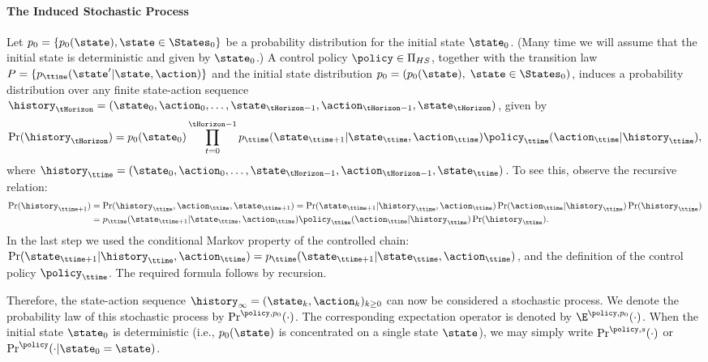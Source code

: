 \paragraph{The Induced Stochastic Process}
Let  ${p_0} = \{ {p_0}(\state),\state \in {\States_0}\} $ be a
probability distribution for the initial state ${\state_0}$. (Many
time we will assume that the initial state is deterministic and
given by $\state_0$.) A control policy $\policy \in {\Pi _{HS}}$,
together with the transition law $P = \{
{p_\ttime}(\state'|\state,\action)\} $ and the initial state
distribution ${p_0} = ({p_0}(\state),\;\state \in {\States_0})$,
induces a probability distribution over any finite state-action
sequence ${\history_\tHorizon} = ({\state_0},{\action_0}, \ldots
,{\state_{\tHorizon - 1}},{\action_{\tHorizon -
1}},{\state_\tHorizon})$, given by
\[\Pr({\history_\tHorizon}) = {p_0}({\state_0})\prod\limits_{t = 0}^{\tHorizon -1} {p_\ttime({\state_{\ttime + 1}}|{\state_\ttime},{\action_\ttime}){\policy _\ttime}({\action_\ttime}|{\history_\ttime})} ,\]
where ${\history_\ttime} = ({\state_0},{\action_0}, \ldots
,{\state_{\tHorizon -1}},{\action_{\tHorizon -1}},{\state_\ttime})$.
%
To see this, observe the recursive relation:
\begin{align*}
\Pr({\history_{\ttime + 1}}) &= \Pr({\history_\ttime},{\action_\ttime},{\state_{\ttime + 1}}) = \Pr({\state_{\ttime + 1}}|{\history_\ttime},{\action_\ttime})\Pr({\action_\ttime}|{\history_\ttime})\Pr({\history_\ttime})\\
 &= {p_\ttime}({\state_{\ttime + 1}}|{\state_\ttime},{\action_\ttime}){\policy _\ttime}({\action_\ttime}|{\history_\ttime})\Pr({\history_\ttime}).
\end{align*}
In the last step we used the conditional Markov property of the
controlled chain: $\Pr({\state_{\ttime +
1}}|{\history_\ttime},{\action_\ttime}) = {p_\ttime}({\state_{\ttime
+ 1}}|{\state_\ttime},{\action_\ttime})$, and the definition of the
control policy $\policy_\ttime $. The required formula follows by
recursion.

Therefore, the state-action sequence ${\history_\infty } =
{({\state_k},{\action_k})_{k \ge 0}}$ can now be considered a
stochastic process. We denote the probability law of this stochastic
process by ${\Pr^{\policy ,{p_0}}}( \cdot )$. The corresponding
expectation operator is denoted by ${\E^{\policy ,{p_0}}}( \cdot )$.
When the initial state ${\state_0}$ is deterministic (i.e.,
${p_0}(\state)$ is concentrated on a single state $\state$), we may
simply write ${\Pr^{\policy ,s}}( \cdot )$  or ${\Pr^\policy }( \cdot
|{\state_0} = \state)$.

